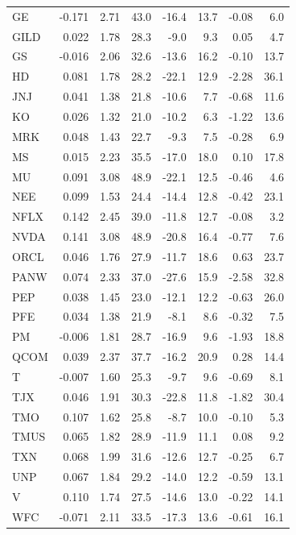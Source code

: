 \documentclass[12pt,a4paper]{article}
\begin{document}
\begin{longtable}{lrrrrrrr}
GE & -0.171 & 2.71 & 43.0 & -16.4 & 13.7 & -0.08 & 6.0 \\
GILD & 0.022 & 1.78 & 28.3 & -9.0 & 9.3 & 0.05 & 4.7 \\
GS & -0.016 & 2.06 & 32.6 & -13.6 & 16.2 & -0.10 & 13.7 \\
HD & 0.081 & 1.78 & 28.2 & -22.1 & 12.9 & -2.28 & 36.1 \\
JNJ & 0.041 & 1.38 & 21.8 & -10.6 & 7.7 & -0.68 & 11.6 \\
KO & 0.026 & 1.32 & 21.0 & -10.2 & 6.3 & -1.22 & 13.6 \\
MRK & 0.048 & 1.43 & 22.7 & -9.3 & 7.5 & -0.28 & 6.9 \\
MS & 0.015 & 2.23 & 35.5 & -17.0 & 18.0 & 0.10 & 17.8 \\
MU & 0.091 & 3.08 & 48.9 & -22.1 & 12.5 & -0.46 & 4.6 \\
NEE & 0.099 & 1.53 & 24.4 & -14.4 & 12.8 & -0.42 & 23.1 \\
NFLX & 0.142 & 2.45 & 39.0 & -11.8 & 12.7 & -0.08 & 3.2 \\
NVDA & 0.141 & 3.08 & 48.9 & -20.8 & 16.4 & -0.77 & 7.6 \\
ORCL & 0.046 & 1.76 & 27.9 & -11.7 & 18.6 & 0.63 & 23.7 \\
PANW & 0.074 & 2.33 & 37.0 & -27.6 & 15.9 & -2.58 & 32.8 \\
PEP & 0.038 & 1.45 & 23.0 & -12.1 & 12.2 & -0.63 & 26.0 \\
PFE & 0.034 & 1.38 & 21.9 & -8.1 & 8.6 & -0.32 & 7.5 \\
PM & -0.006 & 1.81 & 28.7 & -16.9 & 9.6 & -1.93 & 18.8 \\
QCOM & 0.039 & 2.37 & 37.7 & -16.2 & 20.9 & 0.28 & 14.4 \\
T & -0.007 & 1.60 & 25.3 & -9.7 & 9.6 & -0.69 & 8.1 \\
TJX & 0.046 & 1.91 & 30.3 & -22.8 & 11.8 & -1.82 & 30.4 \\
TMO & 0.107 & 1.62 & 25.8 & -8.7 & 10.0 & -0.10 & 5.3 \\
TMUS & 0.065 & 1.82 & 28.9 & -11.9 & 11.1 & 0.08 & 9.2 \\
TXN & 0.068 & 1.99 & 31.6 & -12.6 & 12.7 & -0.25 & 6.7 \\
UNP & 0.067 & 1.84 & 29.2 & -14.0 & 12.2 & -0.59 & 13.1 \\
V & 0.110 & 1.74 & 27.5 & -14.6 & 13.0 & -0.22 & 14.1 \\
WFC & -0.071 & 2.11 & 33.5 & -17.3 & 13.6 & -0.61 & 16.1 \\
\end{longtable}
\end{document}
